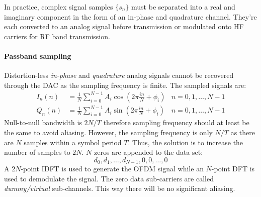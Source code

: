In practice, complex signal samples \(\{s_n\}\) must be separated into a real and imaginary component in the form of an in-phase and quadrature channel. They're each converted to an analog signal before transmission or modulated onto \gls{HF} carriers for \gls{RF} band transmission.
\paragraph{Passband sampling} Distortion-less \emph{in-phase} and \emph{quadrature} analog signals cannot be recovered through the \gls{DAC} as the sampling frequency is finite. The sampled signals are:
\begin{align*}
	I_n(n) &= \frac{1}{N}\sum_{i=0}^{N-1} A_i\cos \left( 2\pi \frac{in}{N} + \phi_i\right) & n = 0,1,\ldots,N-1 \\
	Q_n(n) &= \frac{1}{N}\sum_{i=0}^{N-1} A_i\sin \left( 2\pi \frac{in}{N} + \phi_i\right) & n = 0,1,\ldots,N-1
\end{align*}
Null-to-null bandwidth is \(2N/T\) therefore sampling frequency should at least be the same to avoid aliasing. However, the sampling frequency is only \(N/T\) as there are \(N\) samples within a symbol period \(T\). Thus, the solution is to increase the number of samples to \(2N\). \(N\) zeros are appended to the data set:
\[
	d_0, d_1, \ldots, d_{N-1}, 0, 0, \ldots, 0
\]
A \(2N\)-point \gls{IDFT} is used to generate the \gls{OFDM} signal while an \(N\)-point \gls{DFT} is used to demodulate the signal. The zero data sub-carriers are called \emph{dummy/virtual} sub-channels. This way there will be no significant aliasing.
